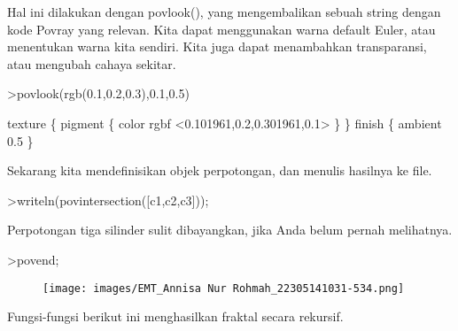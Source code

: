 \documentclass[a4paper,10pt]{article}
\begin{document}
\begin{eulernotebook}
\begin{eulercomment}
Hal ini dilakukan dengan povlook(), yang mengembalikan sebuah string
dengan kode Povray yang relevan. Kita dapat menggunakan warna default
Euler, atau menentukan warna kita sendiri. Kita juga dapat menambahkan
transparansi, atau mengubah cahaya sekitar.
\end{eulercomment}
\begin{eulerprompt}
>povlook(rgb(0.1,0.2,0.3),0.1,0.5)
\end{eulerprompt}
\begin{euleroutput}
   texture \{ pigment \{ color rgbf <0.101961,0.2,0.301961,0.1> \}  \} 
   finish \{ ambient 0.5 \} 
  
\end{euleroutput}
\begin{eulercomment}
Sekarang kita mendefinisikan objek perpotongan, dan menulis hasilnya
ke file.
\end{eulercomment}
\begin{eulerprompt}
>writeln(povintersection([c1,c2,c3]));
\end{eulerprompt}
\begin{eulercomment}
Perpotongan tiga silinder sulit dibayangkan, jika Anda belum pernah
melihatnya.
\end{eulercomment}
\begin{eulerprompt}
>povend;
\end{eulerprompt}
\begin{figure}[h]
    \centering
    \texttt{[image: images/EMT\_Annisa Nur Rohmah\_22305141031-534.png]}
\end{figure}
\begin{eulercomment}
Fungsi-fungsi berikut ini menghasilkan fraktal secara rekursif.


\end{eulercomment}
\end{eulernotebook}
\end{document}
